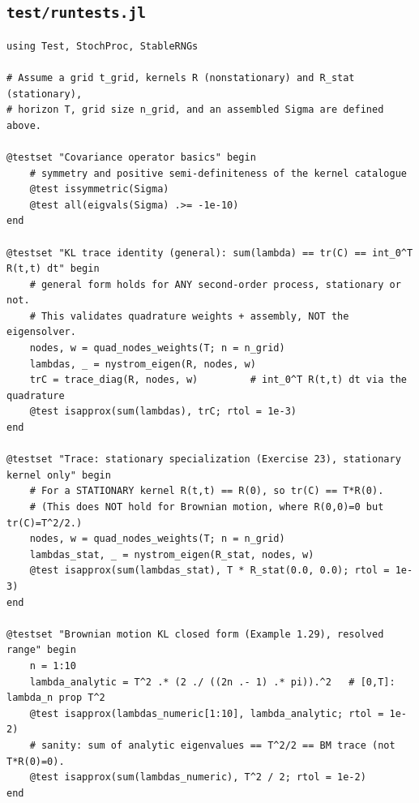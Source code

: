 \documentclass[11pt]{article}
\begin{document}
\subsection*{\texttt{test/runtests.jl}}
\begin{lstlisting}
using Test, StochProc, StableRNGs

# Assume a grid t_grid, kernels R (nonstationary) and R_stat (stationary),
# horizon T, grid size n_grid, and an assembled Sigma are defined above.

@testset "Covariance operator basics" begin
    # symmetry and positive semi-definiteness of the kernel catalogue
    @test issymmetric(Sigma)
    @test all(eigvals(Sigma) .>= -1e-10)
end

@testset "KL trace identity (general): sum(lambda) == tr(C) == int_0^T R(t,t) dt" begin
    # general form holds for ANY second-order process, stationary or not.
    # This validates quadrature weights + assembly, NOT the eigensolver.
    nodes, w = quad_nodes_weights(T; n = n_grid)
    lambdas, _ = nystrom_eigen(R, nodes, w)
    trC = trace_diag(R, nodes, w)         # int_0^T R(t,t) dt via the quadrature
    @test isapprox(sum(lambdas), trC; rtol = 1e-3)
end

@testset "Trace: stationary specialization (Exercise 23), stationary kernel only" begin
    # For a STATIONARY kernel R(t,t) == R(0), so tr(C) == T*R(0).
    # (This does NOT hold for Brownian motion, where R(0,0)=0 but tr(C)=T^2/2.)
    nodes, w = quad_nodes_weights(T; n = n_grid)
    lambdas_stat, _ = nystrom_eigen(R_stat, nodes, w)
    @test isapprox(sum(lambdas_stat), T * R_stat(0.0, 0.0); rtol = 1e-3)
end

@testset "Brownian motion KL closed form (Example 1.29), resolved range" begin
    n = 1:10
    lambda_analytic = T^2 .* (2 ./ ((2n .- 1) .* pi)).^2   # [0,T]: lambda_n prop T^2
    @test isapprox(lambdas_numeric[1:10], lambda_analytic; rtol = 1e-2)
    # sanity: sum of analytic eigenvalues == T^2/2 == BM trace (not T*R(0)=0).
    @test isapprox(sum(lambdas_numeric), T^2 / 2; rtol = 1e-2)
end
\end{lstlisting}

\end{document}
